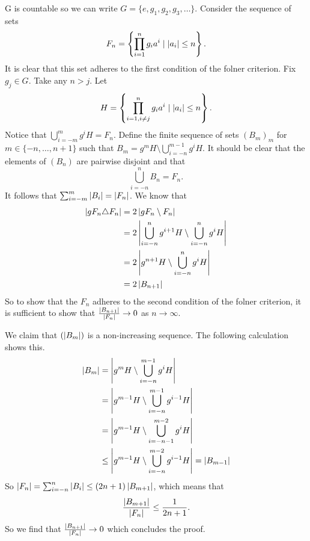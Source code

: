 G is countable so we can write $G = \{e, g_1, g_2, g_3, \dots\}$.
Consider the sequence of sets $$F_n = \left\{\prod_{i = 1}^n g_i a^{i} \mid \left| a_i \right| \le n\right\}.$$ 
It is clear that this set adheres to the first condition of the folner criterion. 
Fix $g_j \in G$. Take any $n > j$.
Let $$H = \left\{\prod_{i = 1, i \ne j}^n g_i a^{i} \mid \left| a_i \right| \le n\right\}.$$
Notice that $\bigcup_{i = -m}^{m} g^{i}H = F_n$.
Define the finite sequence of sets $(B_m)_m$ for $m \in \{-n, \dots, n+1\}$ such that  
$B_m = g^mH \setminus \bigcup_{i=-n}^{m-1}g^iH$.
It should be clear that the elements of $(B_n)$ are pairwise disjoint and that  \[
    \bigcup_{i = -n}^n B_n = F_n 
.\] 
It follows that $\sum_{i=-m}^{m} \left| B_i \right| = \left| F_n \right|$. We know that 
\begin{align*}
    \left| gF_n \triangle F_n \right| &= 2 \left| gF_n \setminus F_n \right| \\
    &= 2 \left| \bigcup_{i = -n}^n g^{i+1}H \setminus \bigcup_{i = -n}^n g^{i}H \right|\\
    &=  2 \left| g^{n+1}H \setminus \bigcup_{i = -n}^n g^{i}H \right|\\
    &= 2 \left| B_{n+1} \right|
\end{align*}
So to show that the $F_n$ adheres to the second condition of the folner criterion, it is sufficient to show that $\frac{\left| B_{n+1} \right|}{\left| F_n \right|} \to 0$ as $n \to \infty$.

We claim that $(\left| B_m \right|)$ is a non-increasing sequence. The following calculation shows this.
\begin{align*}
    \left| B_m \right| &= \left| g^{m}H \setminus \bigcup_{i=-n}^{m-1}g^iH \right|\\
    &= \left| g^{m-1}H \setminus \bigcup_{i=-n}^{m-1}g^{i-1}H \right|\\
    &= \left| g^{m-1}H \setminus \bigcup_{i=-n-1}^{m-2}g^{i}H \right|\\
    &\le \left| g^{m-1}H \setminus \bigcup_{i=-n}^{m-2}g^{i-1}H \right| = \left| B_{m-1} \right|
\end{align*}
So $\left| F_n \right| = \sum_{i=-n}^{n} \left| B_i \right| \le (2n+1) \left| B_{m+1} \right|$, which means that $$\frac{\left| B_{m+1} \right|}{\left| F_n \right|} \le \frac{1}{2n+1}.$$
So we find that $\frac{\left| B_{n+1} \right|}{\left| F_n \right|} \to 0$ which concludes the proof. 